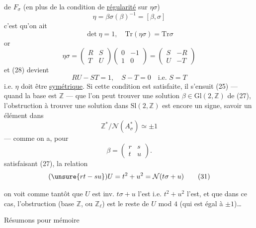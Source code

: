 de $F_\sigma$ (en plus de la condition de \uline{régularité} sur $\eta\sigma$)
\[
\eta=\beta\sigma(\beta)^{-1}=[\beta,\sigma] \tag{27}
\]
c'est qu'on ait
\[
\det\eta=1,\quad \mathrm{Tr}(\eta\sigma)=\mathrm{Tr}\sigma \tag{28}
\]
or
\[
\eta\sigma=\begin{pmatrix}R&S\\T&U\end{pmatrix}
\begin{pmatrix}0&-1\\1&0\end{pmatrix}
=\begin{pmatrix}S&-R\\U&-T\end{pmatrix}
\]
et (28) devient
\[
RU-ST=1,\quad S-T=0\quad\text{i.e. }S=T \tag{29}
\]
i.e. $\eta$ doit être \uline{symétrique}.  Si cette condition est satisfaite, il s'ensuit  (25) --- quand la base est $\mathbb{Z}$ --- que l'on peut trouver une solution $\beta\in\mathrm{Gl}(2,\mathbb{Z})$ de (27), l'obstruction à trouver une solution dans $\mathrm{Sl}(2,\mathbb{Z})$ est encore un signe, savoir un élément dans
\[
\mathbb{Z}^*/\mathcal{N}(A_\sigma^*)\simeq\pm1
\]
--- comme on a, pour
\[
\beta=\begin{pmatrix}r&s\\t&u\end{pmatrix}. \tag{30}
\]
 satisfaisant (27), la relation\margin{\unsure{$\varepsilon$}}
\[
(\unsure{rt-su})U=t^2+u^2=\mathcal{N}(t\sigma+u) \tag{31}
\]


on voit comme tantôt que $U$ est inv.  $t\sigma+u$ l'est i.e. $t^2+u^2$ l'est, et que dans ce cas, l'obstruction  (base $\mathbb{Z}$, ou $\mathbb{Z}_\ell$) est le reste de $U$ mod $4$ (qui est égal à $\pm1$)\ldots
{}

Résumons pour mémoire


